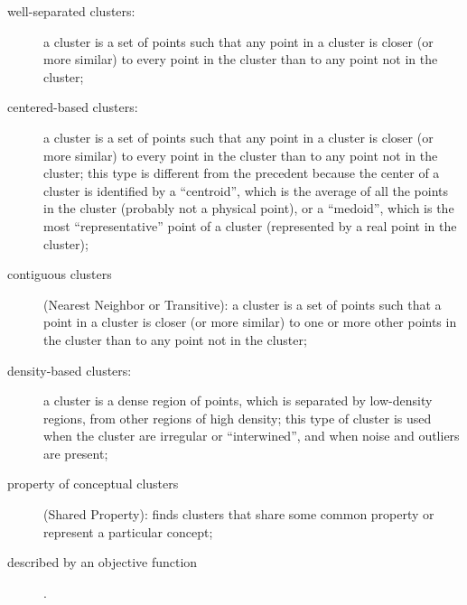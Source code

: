 \begin{description}
	\item[well-separated clusters:] a cluster is a set of points such that any point in a cluster is closer (or more similar) to every point in the cluster than to any point not in the cluster;
	\item[centered-based clusters:] a cluster is a set of points such that any point in a cluster is closer (or more similar) to every point in the cluster than to any point not in the cluster; this type is different from the precedent because the center of a cluster is identified by a ``centroid'', which is the average of all the points in the cluster (probably not a physical point), or a ``medoid'', which is the most ``representative'' point of a cluster (represented by a real point in the cluster);
	\item[contiguous clusters] (Nearest Neighbor or Transitive): a cluster is a set of points such that a point in a cluster is closer (or more similar) to one or more other points in the cluster than to any point not in the cluster;
	\item[density-based clusters:] a cluster is a dense region of points, which is separated by low-density regions, from other regions of high density; this type of cluster is used when the cluster are irregular or ``interwined'', and when noise and outliers are present;
	\item[property of conceptual clusters] (Shared Property): finds clusters that share some common property or represent a particular concept;
	\item[described by an objective function].
\end{description}

